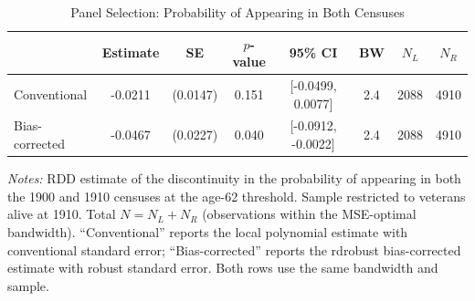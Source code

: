 \begin{table}[htbp]
\centering
\caption{Panel Selection: Probability of Appearing in Both Censuses}
\label{tab:panel_selection}
\begin{tabular}{lccccccc}
\toprule
  & Estimate & SE & $p$-value & 95\% CI & BW & $N_L$ & $N_R$ \\
\midrule
  Conventional & -0.0211 & (0.0147) & 0.151 & [-0.0499, 0.0077] & 2.4 & 2088 & 4910 \\
  Bias-corrected & -0.0467 & (0.0227) & 0.040 & [-0.0912, -0.0022] & 2.4 & 2088 & 4910 \\
\bottomrule
\end{tabular}
\begin{tablenotes}[flushleft]
\small
\item \textit{Notes:} RDD estimate of the discontinuity in the probability of appearing in both the 1900 and 1910 censuses at the age-62 threshold. Sample restricted to veterans alive at 1910. Total $N = N_L + N_R$ (observations within the MSE-optimal bandwidth). ``Conventional'' reports the local polynomial estimate with conventional standard error; ``Bias-corrected'' reports the rdrobust bias-corrected estimate with robust standard error. Both rows use the same bandwidth and sample.
\end{tablenotes}
\end{table}
